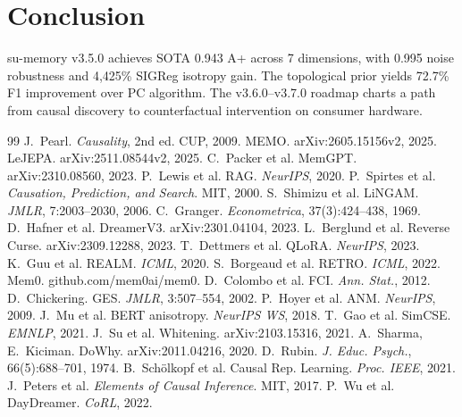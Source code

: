 \documentclass[10pt,twocolumn]{article}
\begin{document}
\section{Conclusion}

su-memory v3.5.0 achieves SOTA 0.943 A+ across 7 dimensions, with 0.995 noise robustness and 4,425\% SIGReg isotropy gain. The topological prior yields 72.7\% F1 improvement over PC algorithm. The v3.6.0--v3.7.0 roadmap charts a path from causal discovery to counterfactual intervention on consumer hardware.

\begin{thebibliography}{99}
 J.~Pearl. \textit{Causality}, 2nd ed. CUP, 2009.
 MEMO. arXiv:2605.15156v2, 2025.
 LeJEPA. arXiv:2511.08544v2, 2025.
 C.~Packer et al. MemGPT. arXiv:2310.08560, 2023.
 P.~Lewis et al. RAG. \textit{NeurIPS}, 2020.
 P.~Spirtes et al. \textit{Causation, Prediction, and Search}. MIT, 2000.
 S.~Shimizu et al. LiNGAM. \textit{JMLR}, 7:2003--2030, 2006.
 C.~Granger. \textit{Econometrica}, 37(3):424--438, 1969.
 D.~Hafner et al. DreamerV3. arXiv:2301.04104, 2023.
 L.~Berglund et al. Reverse Curse. arXiv:2309.12288, 2023.
 T.~Dettmers et al. QLoRA. \textit{NeurIPS}, 2023.
 K.~Guu et al. REALM. \textit{ICML}, 2020.
 S.~Borgeaud et al. RETRO. \textit{ICML}, 2022.
 Mem0. github.com/mem0ai/mem0.
 D.~Colombo et al. FCI. \textit{Ann. Stat.}, 2012.
 D.~Chickering. GES. \textit{JMLR}, 3:507--554, 2002.
 P.~Hoyer et al. ANM. \textit{NeurIPS}, 2009.
 J.~Mu et al. BERT anisotropy. \textit{NeurIPS WS}, 2018.
 T.~Gao et al. SimCSE. \textit{EMNLP}, 2021.
 J.~Su et al. Whitening. arXiv:2103.15316, 2021.
 A.~Sharma, E.~Kiciman. DoWhy. arXiv:2011.04216, 2020.
 D.~Rubin. \textit{J. Educ. Psych.}, 66(5):688--701, 1974.
 B.~Sch\"olkopf et al. Causal Rep. Learning. \textit{Proc. IEEE}, 2021.
 J.~Peters et al. \textit{Elements of Causal Inference}. MIT, 2017.
 P.~Wu et al. DayDreamer. \textit{CoRL}, 2022.
\end{thebibliography}
\end{document}

